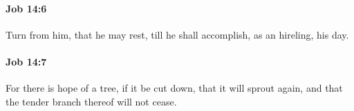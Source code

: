 		\paragraph{Job 14:6} %
			\label{JOB-14-6}

			Turn from him, that he may rest, till he shall accomplish, as an hireling, his day.


		\paragraph{Job 14:7} %
			\label{JOB-14-7}

			For there is hope of a tree, if it be cut down, that it will sprout again, and that the tender branch thereof will not cease.


